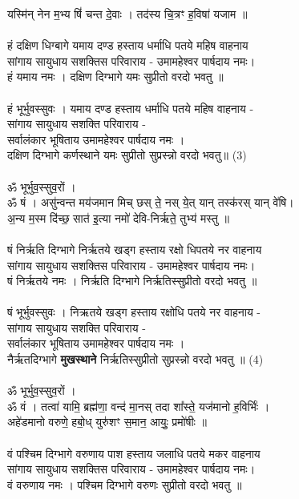 यस्मि॑न् नेन म॒भ्य षिं॑ चन्त दे॒वाः । तद॑स्य चि॒त्रꣳ ह॒विषा॑ यजाम ॥\\
\\
{\small हं दक्षिण धिग्बागे यमाय दण्ड हस्ताय धर्माधि पतये महिष वाहनाय\\
सांगाय सायुधाय सशक्तिस परिवाराय - उमामहेश्वर पार्षदाय नमः।\\
हं यमाय नमः । दक्षिण दिग्भागे यमः सुप्रीतो  वरदो भवतु ॥}\\
\\
हं भूर्भुवस्सुवः । यमाय दण्ड हस्ताय धर्माधि पतये महिष वाहनाय -\\
सांगाय सायुधाय सशक्ति परिवाराय -\\
सर्वालंकार भूषिताय उमामहेश्वर पार्षदाय नमः ।\\
दक्षिण दिग्भागे कर्णस्थाने यमः सुप्रीतो सुप्रस्न्नो वरदो भवतु॥  (3)\\
\\
ॐ भूर्भुव॒स्सुव॒रों ।\\
{\small ॐ} षं । असु॑न्वन्त मय॑जमान मिच् छस् ते॒ नस् ये॒त् यान् तस्क॑रस् यान् वे॑षि।\\
अ॒न्य म॒स्म दि॑च्छ॒ सात॑ इ॒त्या नमो॑ देवि-निर्ऋते॒ तुभ्य॑ मस्तु ॥\\
\\
{\small षं निर्ऋति दिग्भागे निर्ऋतये खड्ग हस्ताय रक्षो धिपतये नर वाहनाय\\
सांगाय सायुधाय सशक्तिस परिवाराय -  उमामहेश्वर पार्षदाय नमः।\\
षं निर्ऋतये नमः । निर्ऋति दिग्भागे निर्ऋतिस्सुप्रीतो वरदो भवतु ॥}\\
\\
षं भूर्भुवस्सुवः । निऋतये खड्ग हस्ताय रक्षोधि पतये नर वाहनाय -\\
सांगाय सायुधाय सशक्ति परिवाराय -\\
सर्वालंकार भूषिताय उमामहेश्वर पार्षदाय नमः ।\\
नैर्ऋतदिग्भागे \textbf{मुखस्थाने} निर्ऋतिस्सुप्रीतो सुप्रस्न्नो वरदो भवतु ॥ (4)\\
\\
ॐ भूर्भुव॒स्सुव॒रों ।\\
{\small ॐ} वं । तत्वा॑ यामि॒ ब्रह्म॑णा॒ वन्द॑ मा॒नस् तदा शा᳚स्ते॒ यज॑मानो ह॒विर्भिः॑ ।\\
अहे॑डमानो वरुणे॒ हबो॒ध् युरु॑शꣳ स॒मान॒ आयुः॒ प्रमो॑षीः ॥\\
\\
{\small वं पश्चिम दिग्भागे वरुणाय पाश हस्ताय जलाधि पतये मकर वाहनाय\\
सांगाय सायुधाय सशक्तिस परिवाराय -  उमामहेश्वर पार्षदाय नमः।\\
वं वरुणाय नमः । पश्चिम दिग्भागे वरुणः सुप्रीतो वरदो भवतु ॥}\\
